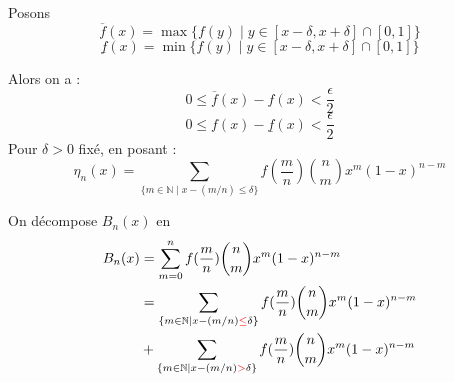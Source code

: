 \documentclass[
	10pt, %
	xcolor={svgnames}
]{beamer}
\begin{document}
\begin{frame}
	Posons 
	\begin{equation*}
		\overline{f}(x) = \max\{f(y) \mid y \in [x-\delta, x+\delta] \cap [0,1]\}
	\end{equation*}
	\begin{equation*}
		\underline{f}(x) = \min\{f(y) \mid y \in [x-\delta, x+\delta] \cap [0,1]\}
	\end{equation*}

Alors on a : 
\begin{equation*}
	0 \leq \overline{f}(x) - f(x) < \frac{\epsilon}{2}
\end{equation*}
\begin{equation*}
	0 \leq f(x) - \underline{f}(x) < \frac{\epsilon}{2}
\end{equation*}
Pour \( \delta > 0  \) fixé, en posant :
\begin{equation*}
	\eta_n(x) = \sum_{\{m \in \mathbb{N} \mid x - (m/n) \leq \delta \}} f(\frac{m}{n}) \binom{n}{m} x^{m}(1-x)^{n-m}
\end{equation*}

On décompose \( B_n(x) \) en 
\begin{align*}
	B_n(x) &= \sum_{m=0}^{n} f(\frac{m}{n}) \binom{n}{m} x^{m}(1-x)^{n-m} \\
	       &= \sum_{\{m \in \mathbb{N} \mid x - (m/n) \mathcolor{red}{\leq} \delta \}} f(\frac{m}{n}) \binom{n}{m} x^{m}(1-x)^{n-m} \\
	       &+ \sum_{\{m \in \mathbb{N} \mid x - (m/n) \mathcolor{red}{>} \delta \}} f(\frac{m}{n}) \binom{n}{m} x^{m}(1-x)^{n-m} \\
\end{align*}
\end{frame}
\end{document}
